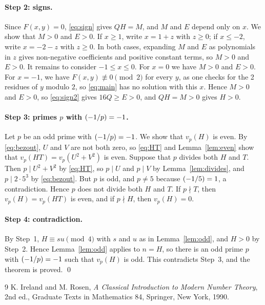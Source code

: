 \documentclass[11pt]{article}
\newcommand{\leg}[2]{\mathchoice{\biggl(\dfrac{#1}{#2}\biggr)}{(#1/#2)}{(#1/#2)}{(#1/#2)}}
\begin{document}
\paragraph{Step 2: signs.} Since $F(x,y)=0$, \eqref{eq:sign} gives $QH=M$, and $M$ and $E$ depend only on $x$. We show that $M>0$ and $E>0$. If $x\geq1$, write $x=1+z$ with $z\geq0$; if $x\leq-2$, write $x=-2-z$ with $z\geq0$. In both cases, expanding $M$ and $E$ as polynomials in $z$ gives non-negative coefficients and positive constant terms, so $M>0$ and $E>0$. It remains to consider $-1\leq x\leq0$. For $x=0$ we have $M>0$ and $E>0$. For $x=-1$, we have $F(x,y)\not\equiv0\pmod{2}$ for every $y$, as one checks for the 2 residues of $y$ modulo $2$, so \eqref{eq:main} has no solution with this $x$. Hence $M>0$ and $E>0$, so \eqref{eq:sign2} gives $16Q\geq E>0$, and $QH=M>0$ gives $H>0$.

\paragraph{\texorpdfstring{Step 3: primes $p$ with $\leg{-1}{p}=-1$.}{Step 3: inert primes.}} Let $p$ be an odd prime with $\leg{-1}{p}=-1$. We show that $v_p(H)$ is even. By \eqref{eq:bezout}, $U$ and $V$ are not both zero, so \eqref{eq:HT} and Lemma~\ref{lem:even} show that $v_p(HT)=v_p(U^2+V^2)$ is even. Suppose that $p$ divides both $H$ and $T$. Then $p\mid U^2+V^2$ by \eqref{eq:HT}, so $p\mid U$ and $p\mid V$ by Lemma~\ref{lem:divides}, and $p\mid 2\cdot 5^{3}$ by \eqref{eq:bezout}. But $p$ is odd, and $p\neq5$ because $\leg{-1}{5}=1$, a contradiction. Hence $p$ does not divide both $H$ and $T$. If $p\nmid T$, then $v_p(H)=v_p(HT)$ is even, and if $p\nmid H$, then $v_p(H)=0$.

\paragraph{Step 4: contradiction.} By Step~1, $H\equiv su\pmod{4}$ with $s$ and $u$ as in Lemma~\ref{lem:odd}, and $H>0$ by Step~2. Hence Lemma~\ref{lem:odd} applies to $n=H$, so there is an odd prime $p$ with $\leg{-1}{p}=-1$ such that $v_p(H)$ is odd. This contradicts Step~3, and the theorem is proved.
\qed

\begin{thebibliography}{9}
 K. Ireland and M. Rosen, \emph{A Classical Introduction to Modern Number Theory}, 2nd ed., Graduate Texts in Mathematics 84, Springer, New York, 1990.
\end{thebibliography}
\end{document}
